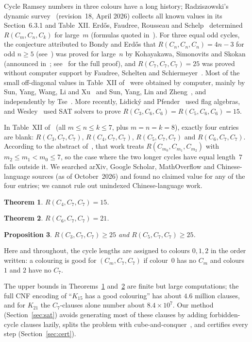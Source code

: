 \documentclass[11pt]{amsart}
\newtheorem{theorem}{Theorem}
\newtheorem{proposition}[theorem]{Proposition}
\theoremstyle{definition}
\theoremstyle{remark}
\begin{document}
Cycle Ramsey numbers in three colours have a long history; Radziszowski's dynamic survey~\cite{Rad} (revision~18, April 2026)
collects all known values in its Section~6.3.1 and Table~XII. Erd\H{o}s, Faudree, Rousseau and Schelp~\cite{EFRS1} determined
$R(C_m,C_n,C_k)$ for large~$m$ (formulas quoted in~\cite[6.3.1(a)]{Rad}). For three equal odd cycles, the conjecture attributed to
Bondy and Erd\H{o}s that $R(C_n,C_n,C_n)=4n-3$ for odd $n\ge5$ (see~\cite[6.3.1]{Rad}) was proved for large~$n$ by
Kohayakawa, Simonovits and Skokan (announced in~\cite{KoSS1}; see~\cite[6.3.1]{Rad} for the full proof), and $R(C_7,C_7,C_7)=25$ was proved without computer support by Faudree, Schelten and
Schiermeyer~\cite{FSS3}. Most of the small off-diagonal values in Table~XII of~\cite{Rad} were obtained by computer, mainly by Sun,
Yang, Wang, Li and Xu~\cite{SunYWLX} and Sun, Yang, Lin and Zheng~\cite{SunYLZ2}, and independently by Tse~\cite{Tse3}. More
recently, Lidick\'y and Pfender~\cite{LidP} used flag algebras, and Wesley~\cite{We3} used SAT solvers to prove
$R(C_3,C_6,C_6)=R(C_5,C_6,C_6)=15$.

In Table~XII of~\cite{Rad} (all $m\le n\le k\le 7$, plus $m=n=k=8$), exactly four entries are blank:
$R(C_3,C_7,C_7)$, $R(C_4,C_7,C_7)$, $R(C_5,C_7,C_7)$ and $R(C_6,C_7,C_7)$. According to the abstract of~\cite{SunYWLX},
that work treats $R(C_{m_0},C_{m_1},C_{m_2})$ with $m_2\le m_1<m_0\le 7$, so the case where the two longer cycles have equal length~$7$ falls outside it.
We searched arXiv, Google Scholar, MathOverflow and Chinese-language sources (as of October~2026) and found no claimed value for any
of the four entries; we cannot rule out unindexed Chinese-language work.

\begin{theorem}\label{thm:main}
$R(C_4,C_7,C_7)=15$.
\end{theorem}

\begin{theorem}\label{thm:c6}
$R(C_6,C_7,C_7)=21$.
\end{theorem}

\begin{proposition}\label{prop:odd}
$R(C_3,C_7,C_7)\ge 25$ and $R(C_5,C_7,C_7)\ge 25$.
\end{proposition}

Here and throughout, the cycle lengths are assigned to colours $0,1,2$ in the order written: a colouring is good for
$(C_m,C_7,C_7)$ if colour~$0$ has no $C_m$ and colours $1$ and $2$ have no $C_7$.

The upper bounds in Theorems~\ref{thm:main} and~\ref{thm:c6} are finite but large computations; the full CNF encoding of ``$K_{15}$ has a good
colouring'' has about $4.6$ million clauses, and for $K_{21}$ the $C_7$-clauses alone number about $8.4\times10^7$. Our method
(Section~\ref{sec:sat}) avoids generating most of these clauses by adding forbidden-cycle clauses lazily, splits the problem with
cube-and-conquer~\cite{HKWB}, and certifies every step (Section~\ref{sec:cert}).
\end{document}
